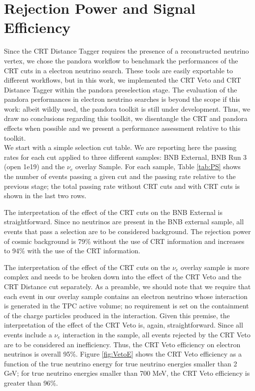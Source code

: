 \section{Rejection Power and Signal Efficiency}\label{sec:RejectionAndEff}
Since the CRT Distance Tagger requires the presence of a reconstructed neutrino vertex, we chose the pandora workflow to benchmark the performances of the CRT cuts in a electron neutrino search. These tools are easily exportable to different workflows, but in this work, we implemented the CRT Veto and CRT Distance Tagger within the pandora preselection stage. The evaluation of the pandora performances in electron neutrino searches is beyond the scope if this work: albeit wildly used, the pandora toolkit is still under development. Thus, we draw no conclusions regarding this toolkit, we disentangle the CRT  and pandora effects when possible and we present a performance assessment relative to this toolkit.\\

We start with a simple selection cut table. We are reporting here the passing rates for each cut applied to three different samples:  BNB External,  BNB Run 3 (open 1e19) and the $\nu_e$ overlay Sample. For each sample, Table \ref{tab:PS} shows the number of events passing a given cut and the  passing rate relative to the previous stage; the total passing rate without CRT cuts and with CRT cuts is shown in the last two rows.

The interpretation of the effect of the CRT cuts on the BNB External is straightforward. Since no neutrinos are present in the BNB external sample, all events that pass a selection are to be considered background.  The rejection power of cosmic background is 79\% without the use of CRT information and increases to 94\% with the use of the CRT information.

The interpretation of the effect of the CRT cuts on the $\nu_e$ overlay sample is more complex and needs to be broken down into the effect of the CRT Veto and the CRT Distance cut separately.  
As a preamble, we should note that we require that each event in our overlay sample contains an electron neutrino whose interaction is generated in the TPC active volume; no requirement is set on the containment of the charge particles produced in the interaction. Given this premise, the interpretation of the effect of the CRT Veto is, again, straightforward. Since all events include a $\nu_e$ interaction in the sample, all events rejected by the CRT Veto are to be considered an inefficiency.  Thus, the CRT Veto efficiency on electron neutrinos is overall 95\%. Figure \ref{fig:VetoE} shows the CRT Veto efficiency as a function of the true neutrino energy for true neutrino energies smaller than 2 GeV;  for true neutrino energies smaller than 700 MeV, the CRT Veto efficiency is greater than 96\%. 


